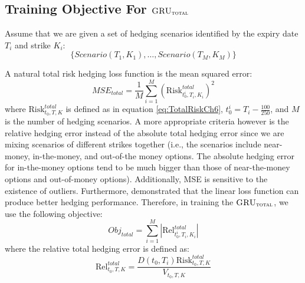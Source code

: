 \documentclass[letterpaper,12pt,titlepage,oneside,final]{book}
\numberwithin{equation}{section}
\theoremstyle{definition}
\newcommand{\modelT}{\textsc{GRU}_{\textsc{total}}}
\begin{document}
\subsection{Training Objective For $\modelT$}
\label{sec:TotalModelObj}
Assume that we are given  a set  of hedging scenarios identified by the expiry date $T_i$ and strike $K_i$:
\[
\{Scenario(T_1,K_1), \dots, Scenario(T_M,K_M)\}	
\]


A natural total risk hedging loss function is the mean squared error:
\[
MSE_{total}=\frac{1}{M} \sum_{i=1}^M  (\text{Risk}^{total}_{t_0^i,T_i,K_i})^2
\]
where $\text{Risk}^{total}_{t_0,T,K}$ is defined as in equation \eqref{eq:TotalRiskCh6},  $t_0^i=T_i-\frac{100}{250}$, and $M$ is the number of hedging scenarios.
A more appropriate criteria however is the relative hedging error instead of the absolute total hedging error since we are mixing scenarios of different strikes together (i.e., the scenarios include near-money, in-the-money, and out-of-the money options. The absolute hedging error for in-the-money options tend to be much bigger than those of  near-the-money options and out-of-money options). Additionally, MSE is sensitive to the existence of outliers. Furthermore, \citet{coleman2007total} demonstrated that the linear loss function can produce better hedging performance. 
Therefore, in training the $\modelT$, we use the following objective:
\begin{equation}
Obj_{total}=\sum_{i=1}^M \left|\text{Rel}^{total}_{t_0^{i},T_i,K_i}\right|
\label{eq:totalObjLinear}
\end{equation}
where the relative total hedging error is defined as:
\begin{equation}
	\text{Rel}^{total}_{t_0,T,K}
	=\frac{D(t_0,T_i)  \text{Risk}^{total}_{t_0,T,K}}{V_{t_0,T,K}}
	\label{eq:relHError}
\end{equation}
\end{document}
